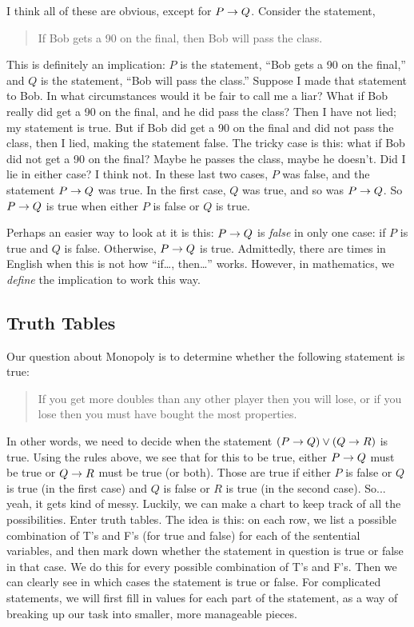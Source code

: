\documentclass[12pt]{article}
\begin{document}
I think all of these are obvious, except for $P \rightarrow Q$.  Consider the statement, 
\begin{quotation}If Bob gets a 90 on the final, then Bob will pass the class.\end{quotation}  This is definitely an implication: $P$ is the statement, ``Bob gets a 90 on the final,'' and $Q$ is the statement, ``Bob will pass the class.'' Suppose I made that statement to Bob.  In what circumstances would it be fair to call me a liar?  What if Bob really did get a 90 on the final, and he did pass the class?  Then I have not lied; my statement is true.  But if Bob did get a 90 on the final and did not pass the class, then I lied, making the statement false.  The tricky case is this: what if Bob did not get a 90 on the final?  Maybe he passes the class, maybe he doesn't.  Did I lie in either case?  I think not.  In these last two cases, $P$ was false, and the statement $P \rightarrow Q$ was true.  In the first case, $Q$ was true, and so was $P \rightarrow Q$.  So $P \rightarrow Q$ is true when either $P$ is false or $Q$ is true.  

Perhaps an easier way to look at it is this: $P \rightarrow Q$ 
is {\em false} in only one case: if $P$ is true and $Q$ is false.  Otherwise, $P \rightarrow Q$ is true.  Admittedly, there are times in English when this is not how ``if\ldots, then\ldots'' works.  However, in mathematics, we {\em define} the implication to work this way.


\subsection{Truth Tables}

Our question about Monopoly is to determine whether the following statement is true:
\begin{quote}
If you get more doubles than any other player then you will lose, or if you lose then you must have bought the most properties.
\end{quote}
In other words, we need to decide when the statement $(P \rightarrow Q) \vee (Q \rightarrow R)$ is true.  Using the rules above, we see that for this to be true, either $P \rightarrow Q$ must be true or $Q \rightarrow R$ must be true (or both).  Those are true if either $P$ is false or $Q$ is true (in the first case) and $Q$ is false or $R$ is true (in the second case).  So... yeah, it gets kind of messy.  Luckily, we can make a chart to keep track of all the possibilities.  Enter truth tables.  The idea is this: on each row, we list a possible combination of T's and F's (for true and false) for each of the sentential variables, and then mark down whether the statement in question is true or false in that case.  We do this for every possible combination of T's and F's.  Then we can clearly see in which cases the statement is true or false.  For complicated statements, we will first fill in values for each part of the statement, as a way of breaking up our task into smaller, more manageable pieces.
\end{document}
